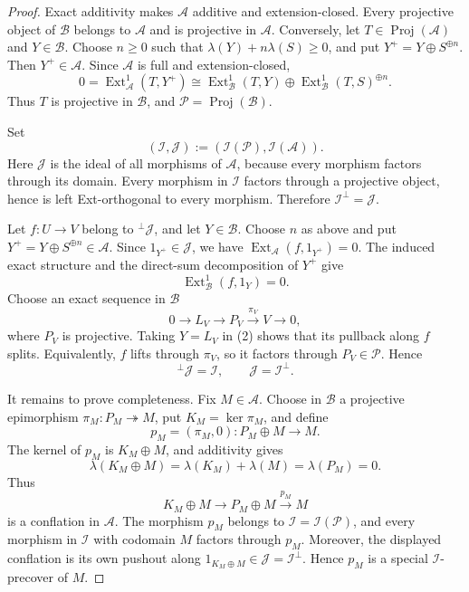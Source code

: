 \documentclass[10pt]{article}
\theoremstyle{remark}\newtheorem{remark}[theorem]{Remark}
\begin{document}
\begin{proof}
Exact additivity makes \(\mathcal A\) additive and extension-closed.
Every projective object of \(\mathcal B\) belongs to \(\mathcal A\) and
is projective in \(\mathcal A\). Conversely, let
\(T\in\operatorname{Proj}(\mathcal A)\) and \(Y\in\mathcal B\).
Choose \(n\geq0\) such that \(\lambda(Y)+n\lambda(S)\geq0\), and put
\(Y^+=Y\oplus S^{\oplus n}\). Then \(Y^+\in\mathcal A\). Since
\(\mathcal A\) is full and extension-closed,
\[
0=\operatorname{Ext}^1_{\mathcal A}(T,Y^+)
 \cong\operatorname{Ext}^1_{\mathcal B}(T,Y)
 \oplus\operatorname{Ext}^1_{\mathcal B}(T,S)^{\oplus n}.
\]
Thus \(T\) is projective in \(\mathcal B\), and
\(\mathcal P=\operatorname{Proj}(\mathcal B)\).

Set
\[
 (\mathcal I,\mathcal J)
 :=(\mathcal I(\mathcal P),\mathcal I(\mathcal A)).
\]
Here \(\mathcal J\) is the ideal of all morphisms of \(\mathcal A\),
because every morphism factors through its domain. Every morphism in
\(\mathcal I\) factors through a projective object, hence is left
Ext-orthogonal to every morphism. Therefore
\(\mathcal I^{\perp}=\mathcal J\).

Let \(f:U\to V\) belong to \({}^{\perp}\mathcal J\), and let
\(Y\in\mathcal B\). Choose \(n\) as above and put
\(Y^+=Y\oplus S^{\oplus n}\in\mathcal A\). Since
\(1_{Y^+}\in\mathcal J\), we have
\(\operatorname{Ext}_{\mathcal A}(f,1_{Y^+})=0\). The induced exact
structure and the direct-sum decomposition of \(Y^+\) give
\[
 \operatorname{Ext}^1_{\mathcal B}(f,1_Y)=0.             \tag{2}
\]
Choose an exact sequence in \(\mathcal B\)
\[
0\longrightarrow L_V\longrightarrow P_V
 \xrightarrow{\pi_V}V\longrightarrow0,
\]
where \(P_V\) is projective. Taking \(Y=L_V\) in (2) shows that its
pullback along \(f\) splits. Equivalently, \(f\) lifts through
\(\pi_V\), so it factors through \(P_V\in\mathcal P\). Hence
\[
 {}^{\perp}\mathcal J=\mathcal I,
 \qquad \mathcal J=\mathcal I^{\perp}.                   \tag{3}
\]

It remains to prove completeness. Fix \(M\in\mathcal A\). Choose in
\(\mathcal B\) a projective epimorphism
\(\pi_M:P_M\twoheadrightarrow M\), put \(K_M=\ker\pi_M\), and define
\[
 p_M=(\pi_M,0):P_M\oplus M\longrightarrow M.
\]
The kernel of \(p_M\) is \(K_M\oplus M\), and additivity gives
\[
 \lambda(K_M\oplus M)
 =\lambda(K_M)+\lambda(M)=\lambda(P_M)=0.
\]
Thus
\[
 K_M\oplus M\longrightarrow P_M\oplus M
 \xrightarrow{p_M}M
\]
is a conflation in \(\mathcal A\). The morphism \(p_M\) belongs to
\(\mathcal I=\mathcal I(\mathcal P)\), and every morphism in
\(\mathcal I\) with codomain \(M\) factors through \(p_M\). Moreover,
the displayed conflation is its own pushout along
\(1_{K_M\oplus M}\in\mathcal J=\mathcal I^{\perp}\). Hence \(p_M\)
is a special \(\mathcal I\)-precover of \(M\).


\end{proof}
\end{document}
